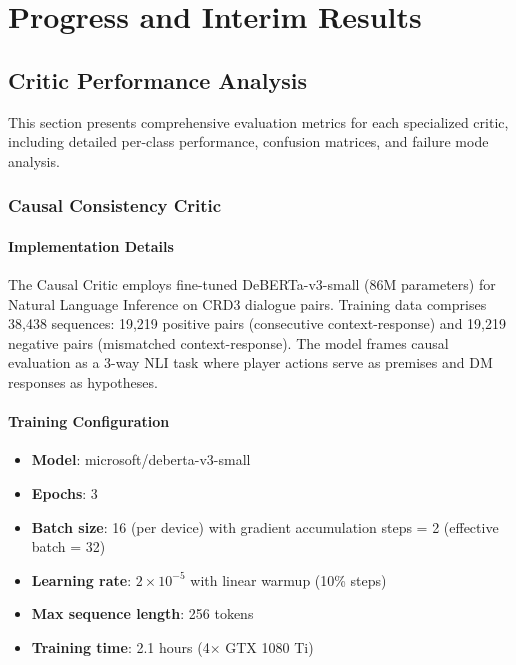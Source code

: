 \documentclass[11pt]{article}
\begin{document}
\section{Progress and Interim Results}

\subsection{Critic Performance Analysis}

This section presents comprehensive evaluation metrics for each specialized critic, including detailed per-class performance, confusion matrices, and failure mode analysis.

\subsubsection{Causal Consistency Critic}

\paragraph{Implementation Details}
The Causal Critic employs fine-tuned DeBERTa-v3-small (86M parameters) for Natural Language Inference on CRD3 dialogue pairs. Training data comprises 38,438 sequences: 19,219 positive pairs (consecutive context-response) and 19,219 negative pairs (mismatched context-response). The model frames causal evaluation as a 3-way NLI task where player actions serve as premises and DM responses as hypotheses.

\paragraph{Training Configuration}
\begin{itemize}
    \item \textbf{Model}: microsoft/deberta-v3-small
    \item \textbf{Epochs}: 3 
    \item \textbf{Batch size}: 16 (per device) with gradient accumulation steps = 2 (effective batch = 32)
    \item \textbf{Learning rate}: $2 \times 10^{-5}$ with linear warmup (10\% steps)
    \item \textbf{Max sequence length}: 256 tokens
    \item \textbf{Training time}: 2.1 hours (4$\times$ GTX 1080 Ti)
\end{itemize}
\end{document}
